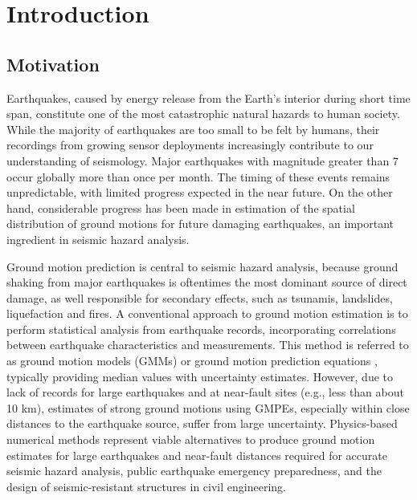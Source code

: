 
\linespread{1.7}
\chapter{Introduction}
\linespread{2.0}
\label{chap:intro}

\section{Motivation}
Earthquakes, caused by energy release from the Earth's interior during short time span, constitute one of the most catastrophic natural hazards to human society. While the majority of earthquakes are too small to be felt by humans, their recordings from growing sensor deployments increasingly contribute to our understanding of seismology. Major earthquakes with magnitude greater than 7 occur globally more than once per month. The timing of these events remains unpredictable, with limited progress expected in the near future. On the other hand, considerable progress has been made in estimation of the spatial distribution of ground motions for future damaging earthquakes, an important ingredient in seismic hazard analysis.

Ground motion prediction is central to seismic hazard analysis, because ground shaking from major earthquakes is oftentimes the most dominant source of direct damage, as well responsible for secondary effects, such as tsunamis, landslides, liquefaction and fires. A conventional approach to ground motion estimation is to perform statistical analysis from earthquake records, incorporating correlations between earthquake characteristics and measurements. This method is referred to as ground motion models (GMMs) or ground motion prediction equations \citep[GMPEs; e.g., ][]{abrahamsonSummaryASK14Ground2014,booreNGAWest2EquationsPredicting2014,campbellNGAWest2GroundMotion2014,chiouUpdateChiouYoungs2014, idrissNGAWest2EmpiricalModel2014}, typically providing median values with uncertainty estimates. However, due to lack of records for large earthquakes and at near-fault sites (e.g., less than about 10 km), estimates of strong ground motions using GMPEs, especially within close distances to the earthquake source, suffer from large uncertainty. Physics-based numerical methods represent viable alternatives to produce ground motion estimates for large earthquakes and near-fault distances required for accurate seismic hazard analysis, public earthquake emergency preparedness, and the design of seismic-resistant structures in civil engineering.

